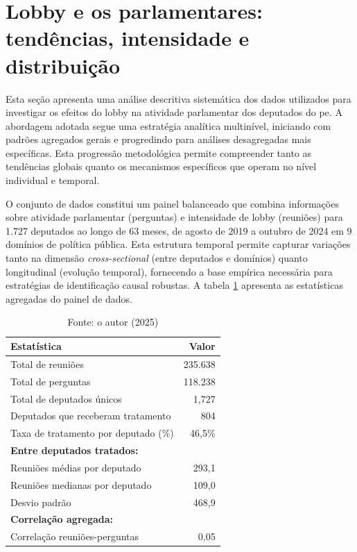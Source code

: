 \section{Lobby e os parlamentares: tendências, intensidade e distribuição}
\label{sec:resultados_descritica}

Esta seção apresenta uma análise descritiva sistemática dos dados utilizados para investigar os efeitos do lobby na atividade parlamentar dos deputados do \acrshort{pe}. A abordagem adotada segue uma estratégia analítica multinível, iniciando com padrões agregados gerais e progredindo para análises desagregadas mais específicas. Esta progressão metodológica permite compreender tanto as tendências globais quanto os mecanismos específicos que operam no nível individual e temporal.

O conjunto de dados constitui um painel balanceado que combina informações sobre atividade parlamentar (perguntas) e intensidade de lobby (reuniões) para 1.727 deputados ao longo de 63 meses, de agosto de 2019 a outubro de 2024 em 9 domínios de política pública. Esta estrutura temporal permite capturar variações tanto na dimensão \textit{cross-sectional} (entre deputados e domínios) quanto longitudinal (evolução temporal), fornecendo a base empírica necessária para estratégias de identificação causal robustas. A tabela \ref{tab:mep_treatment_stats} apresenta as estatísticas agregadas do painel de dados.

\begin{table}[htbp]
    \centering
    \caption{Estatísticas agregadas de tratamento por deputado}
    \label{tab:mep_treatment_stats}
    \begin{tabular}{lr}
    \toprule
    \textbf{Estatística} & \textbf{Valor} \\
    \midrule
    Total de reuniões & 235.638 \\
    Total de perguntas & 118.238 \\
    Total de deputados únicos & 1{,}727 \\
    Deputados que receberam tratamento & 804 \\
    Taxa de tratamento por deputado (\%) & 46{,}5\% \\
    \midrule
    \textbf{Entre deputados tratados:} & \\
    Reuniões médias por deputado & 293{,}1 \\
    Reuniões medianas por deputado & 109{,}0 \\
    Desvio padrão & 468{,}9 \\
    \midrule
    \textbf{Correlação agregada:} & \\
    Correlação reuniões-perguntas & 0{,}05 \\
    \bottomrule
    \end{tabular}
    \caption*{Fonte: o autor (2025)}
\end{table}

